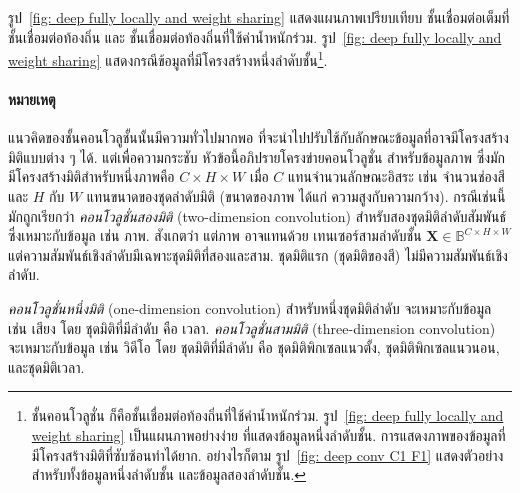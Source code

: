 รูป~\ref{fig: deep fully locally and weight sharing}
แสดงแผนภาพเปรียบเทียบ ชั้นเชื่อมต่อเต็มที่ ชั้นเชื่อมต่อท้องถิ่น และ ชั้นเชื่อมต่อท้องถิ่นที่ใช้ค่าน้ำหนักร่วม.
รูป~\ref{fig: deep fully locally and weight sharing}
แสดงกรณีข้อมูลที่มีโครงสร้างหนึ่งลำดับชั้น\footnote{%
ชั้นคอนโวลูชั่น ก็คือชั้นเชื่อมต่อท้องถิ่นที่ใช้ค่าน้ำหนักร่วม.
รูป~\ref{fig: deep fully locally and weight sharing} เป็นแผนภาพอย่างง่าย
ที่แสดงข้อมูลหนึ่งลำดับชั้น.
การแสดงภาพของข้อมูลที่มีโครงสร้างมิติที่ซับซ้อนทำได้ยาก.
อย่างไรก็ตาม
รูป~\ref{fig: deep conv C1 F1}
แสดงตัวอย่างสำหรับทั้งข้อมูลหนึ่งลำดับชั้น และข้อมูลสองลำดับชั้น.
}.

\paragraph{หมายเหตุ} %
แนวคิดของชั้นคอนโวลูชั้นนั้นมีความทั่วไปมากพอ ที่จะนำไปปรับใช้กับลักษณะข้อมูลที่อาจมีโครงสร้างมิติแบบต่าง ๆ ได้.
แต่เพื่อความกระชับ หัวข้อนี้อภิปรายโครงข่ายคอนโวลูชั่น สำหรับข้อมูลภาพ 
ซึ่งมักมีโครงสร้างมิติสำหรับหนึ่งภาพคือ $C \times H \times W$ เมื่อ 
$C$ แทนจำนวนลักษณะอิสระ เช่น จำนวนช่องสี
และ $H$ กับ $W$ แทนขนาดของชุดลำดับมิติ (ขนาดของภาพ ได้แก่ ความสูงกับความกว้าง).
กรณีเช่นนี้ มักถูกเรียกว่า \textit{คอนโวลูชั่นสองมิติ} (two-dimension convolution) สำหรับสองชุดมิติลำดับสัมพันธ์ ซึ่งเหมาะกับข้อมูล เช่น ภาพ.
สังเกตว่า แต่ภาพ อาจแทนด้วย เทนเซอร์สามลำดับชั้น $\bm{X} \in \mathbb{B}^{C \times H \times W}$
แต่ความสัมพันธ์เชิงลำดับมีเฉพาะชุดมิติที่สองและสาม.
ชุดมิติแรก (ชุดมิติของสี) ไม่มีความสัมพันธ์เชิงลำดับ.

\textit{คอนโวลูชั่นหนึ่งมิติ} (one-dimension convolution) สำหรับหนึ่งชุดมิติลำดับ จะเหมาะกับข้อมูล เช่น เสียง
โดย ชุดมิติที่มีลำดับ คือ เวลา.
\textit{คอนโวลูชั่นสามมิติ} (three-dimension convolution) จะเหมาะกับข้อมูล เช่น วิดีโอ
โดย
ชุดมิติที่มีลำดับ คือ 
ชุดมิติพิกเซลแนวตั้ง,
ชุดมิติพิกเซลแนวนอน,
และชุดมิติเวลา.


